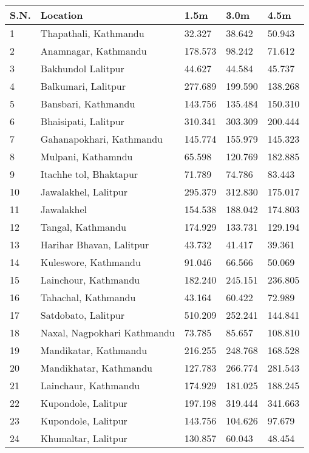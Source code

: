 \begin{tabularx}{\textwidth}{ | l | p{} | X | X | X | }
\hline
 \textbf{S.N.} & \textbf{Location} & \textbf{1.5m} & \textbf{3.0m} & \textbf{4.5m}\\
\hline
 1 & Thapathali, Kathmandu & 32.327 & 38.642 & 50.943 \\
 2 & Anamnagar, Kathmandu & 178.573 & 98.242 & 71.612 \\
 3 & Bakhundol Lalitpur & 44.627 & 44.584 & 45.737 \\
 4 & Balkumari, Lalitpur & 277.689 & 199.590 & 138.268 \\
 5 & Bansbari, Kathmandu & 143.756 & 135.484 & 150.310 \\
 6 & Bhaisipati, Lalitpur & 310.341 & 303.309 & 200.444 \\
 7 & Gahanapokhari, Kathmandu & 145.774 & 155.979 & 145.323 \\
 8 & Mulpani, Kathamndu  & 65.598 & 120.769 & 182.885 \\
 9 & Itachhe tol, Bhaktapur & 71.789 & 74.786 & 83.443 \\
 10 & Jawalakhel, Lalitpur  & 295.379 & 312.830 & 175.017 \\
 11 & Jawalakhel & 154.538 & 188.042 & 174.803 \\
 12 & Tangal, Kathmandu & 174.929 & 133.731 & 129.194 \\
 13 & Harihar Bhavan, Lalitpur & 43.732 & 41.417 & 39.361 \\
 14 & Kuleswore, Kathmandu & 91.046 & 66.566 & 50.069 \\
 15 & Lainchour, Kathmandu & 182.240 & 245.151 & 236.805 \\
 16 & Tahachal, Kathmandu & 43.164 & 60.422 & 72.989 \\
 17 & Satdobato, Lalitpur & 510.209 & 252.241 & 144.841 \\
 18 & Naxal, Nagpokhari Kathmandu  & 73.785 & 85.657 & 108.810 \\
 19 & Mandikatar, Kathmandu  & 216.255 & 248.768 & 168.528 \\
 20 & Mandikhatar, Kathmandu  & 127.783 & 266.774 & 281.543 \\
 21 & Lainchaur, Kathmandu  & 174.929 & 181.025 & 188.245 \\
 22 & Kupondole, Lalitpur & 197.198 & 319.444 & 341.663 \\
 23 & Kupondole, Lalitpur & 143.756 & 104.626 & 97.679 \\
 24 & Khumaltar, Lalitpur & 130.857 & 60.043 & 48.454 \\

\end{tabularx}
